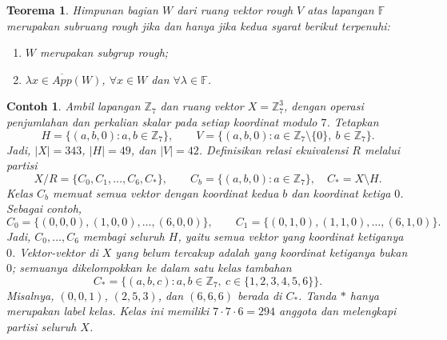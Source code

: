 \documentclass[a4paper,11pt]{article}
\theoremstyle{plain}
\newtheorem{contoh}[definisi]{Contoh}
\newtheorem{teorema}[definisi]{Teorema}
\newcommand{\F}{\mathbb{F}}
\newcommand{\Z}{\mathbb{Z}}
\newcommand{\upp}[1]{\overline{App}(#1)}
\begin{document}
\begin{teorema}\label{def:17}
      Himpunan bagian $W$ dari ruang vektor rough $V$ atas lapangan $\F$
      merupakan subruang rough jika dan hanya jika kedua syarat berikut
      terpenuhi:
      \begin{enumerate}
            \item $W$ merupakan subgrup rough;
            \item $\lambda x\in\upp{W}$, $\forall x\in W$ dan $\forall\lambda\in\F$.
      \end{enumerate}
\end{teorema}

\begin{contoh}\label{ex:18}
      Ambil lapangan $\Z_7$ dan ruang vektor $X=\Z_7^3$, dengan operasi
      penjumlahan dan perkalian skalar pada setiap koordinat modulo $7$.
      Tetapkan
      \[
            H=\{(a,b,0):a,b\in\Z_7\},\qquad
            V=\{(a,b,0):a\in\Z_7\setminus\{0\},\ b\in\Z_7\}.
      \]
      Jadi, $|X|=343$, $|H|=49$, dan $|V|=42$.
      Definisikan relasi ekuivalensi $R$ melalui partisi
      \[
            X/R=\{C_0,C_1,\ldots,C_6,C_*\},\qquad
            C_b=\{(a,b,0):a\in\Z_7\},\quad C_*=X\setminus H.
      \]
      Kelas $C_b$ memuat semua vektor dengan koordinat kedua $b$ dan
      koordinat ketiga $0$. Sebagai contoh,
      \[
            C_0=\{(0,0,0),(1,0,0),\ldots,(6,0,0)\},\qquad
            C_1=\{(0,1,0),(1,1,0),\ldots,(6,1,0)\}.
      \]
      Jadi, $C_0,\ldots,C_6$ membagi seluruh $H$, yaitu semua vektor
      yang koordinat ketiganya $0$. Vektor-vektor di $X$ yang belum
      tercakup adalah yang koordinat ketiganya bukan $0$; semuanya
      dikelompokkan ke dalam satu kelas tambahan
      \[
            C_*=\{(a,b,c):a,b\in\Z_7,\ c\in\{1,2,3,4,5,6\}\}.
      \]
      Misalnya, $(0,0,1)$, $(2,5,3)$, dan $(6,6,6)$ berada di $C_*$.
      Tanda $*$ hanya merupakan label kelas. Kelas ini memiliki
      $7\cdot7\cdot6=294$ anggota dan melengkapi partisi seluruh $X$.


\end{contoh}
\end{document}
